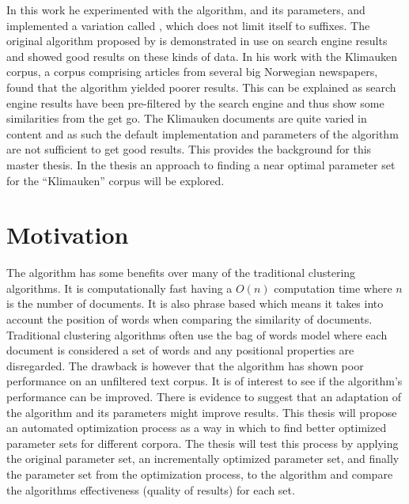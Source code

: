 In this work he experimented with the \STC algorithm, and its parameters, and implemented a variation called \CTC, which does not limit itself to suffixes. The original \STC algorithm proposed by \textcite{Oren1998} is demonstrated in use on search engine results and showed good results on these kinds of data. In his work with the Klimauken corpus, a corpus comprising articles from several big Norwegian newspapers, \cite{Moe2013} found that the \STC algorithm yielded poorer results. This can be explained as search engine results have been pre-filtered by the search engine and thus show some similarities from the get go. The Klimauken documents are quite varied in content and as such the default implementation and parameters of the \STC algorithm are not sufficient to get good results. This provides the background for this master thesis. In the thesis an approach to finding a near optimal parameter set for the ``Klimauken'' corpus will be explored.


\section{Motivation}

The \STC algorithm has some benefits over many of the traditional clustering algorithms. It is computationally fast having a \(O(n)\) computation time where \(n\) is the number of documents. It is also phrase based which means it takes into account the position of words when comparing the similarity of documents. Traditional clustering algorithms often use the bag of words model where each document is considered a set of words and any positional properties are disregarded. The drawback is however that the \STC algorithm has shown poor performance on an unfiltered text corpus. It is of interest to see if the algorithm's performance can be improved. There is evidence to suggest that an adaptation of the algorithm and its parameters might improve results. This thesis will propose an automated optimization process as a way in which to find better optimized parameter sets for different corpora. The thesis will test this process by applying the original parameter set, an incrementally optimized parameter set, and finally the parameter set from the optimization process, to the algorithm and compare the algorithms effectiveness (quality of results) for each set.

